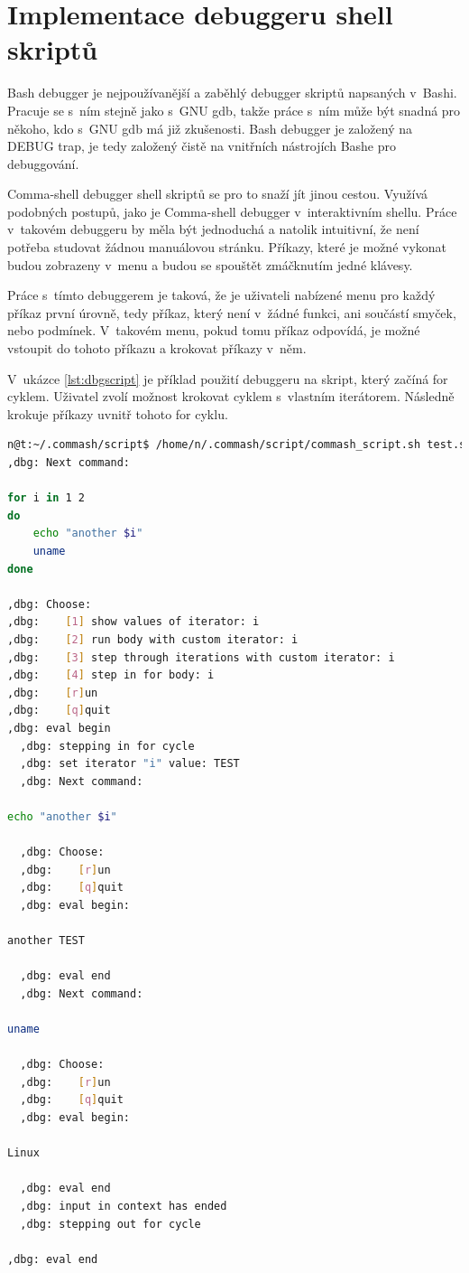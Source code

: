 \documentclass[thesis=M,czech]{FITthesis}[2012/06/26]
\begin{document}
\section{Implementace debuggeru shell skriptů}

Bash debugger je nejpoužívanější a zaběhlý debugger skriptů napsaných v~Bashi. Pracuje se s~ním stejně jako s~GNU gdb, takže práce s~ním může být snadná pro někoho, kdo s~GNU gdb má již zkušenosti. Bash debugger je založený na DEBUG trap, je tedy založený čistě na vnitřních nástrojích Bashe pro debuggování.

Comma-shell debugger shell skriptů se pro to snaží jít jinou cestou. Využívá podobných postupů, jako je Comma-shell debugger v~interaktivním shellu. Práce v~takovém debuggeru by měla být jednoduchá a natolik intuitivní, že není potřeba studovat žádnou manuálovou stránku. Příkazy, které je možné vykonat budou zobrazeny v~menu a budou se spouštět zmáčknutím jedné klávesy.

Práce s~tímto debuggerem je taková, že je uživateli nabízené menu pro každý příkaz první úrovně, tedy příkaz, který není v~žádné funkci, ani součástí smyček, nebo podmínek. V~takovém menu, pokud tomu příkaz odpovídá, je možné vstoupit do tohoto příkazu a krokovat příkazy v~něm.

V~ukázce \ref{lst:dbgscript} je příklad použití debuggeru na skript, který začíná for cyklem. Uživatel zvolí možnost krokovat cyklem s~vlastním iterátorem. Následně krokuje příkazy uvnitř tohoto for cyklu.

\begin{minipage}{\linewidth}
\begin{lstlisting}[language=bash, caption={Debugger shell skriptu}, label={lst:dbgscript}]
n@t:~/.commash/script$ /home/n/.commash/script/commash_script.sh test.sh
,dbg: Next command:

for i in 1 2
do
	echo "another $i"
	uname
done

,dbg: Choose:
,dbg:    [1] show values of iterator: i
,dbg:    [2] run body with custom iterator: i
,dbg:    [3] step through iterations with custom iterator: i
,dbg:    [4] step in for body: i
,dbg:    [r]un
,dbg:    [q]quit
,dbg: eval begin
  ,dbg: stepping in for cycle
  ,dbg: set iterator "i" value: TEST
  ,dbg: Next command:

echo "another $i"

  ,dbg: Choose:
  ,dbg:    [r]un
  ,dbg:    [q]quit
  ,dbg: eval begin:

another TEST

  ,dbg: eval end
  ,dbg: Next command:

uname

  ,dbg: Choose:
  ,dbg:    [r]un
  ,dbg:    [q]quit
  ,dbg: eval begin:

Linux

  ,dbg: eval end
  ,dbg: input in context has ended
  ,dbg: stepping out for cycle

,dbg: eval end
\end{lstlisting}
\end{minipage}
\end{document}
